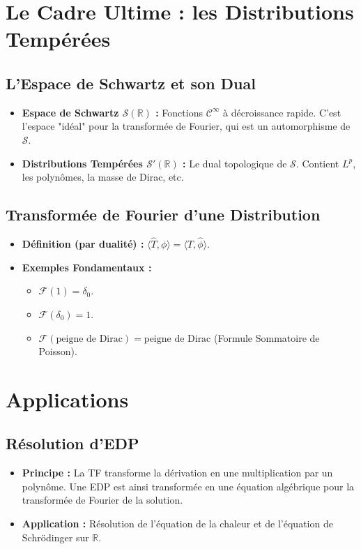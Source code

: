 \documentclass[12pt, a4paper, parskip=full]{report}
\theoremstyle{agregstyle}
\begin{document}
\section{Le Cadre Ultime : les Distributions Tempérées}
\subsection{L'Espace de Schwartz et son Dual}
\begin{itemize}
    \item \textbf{Espace de Schwartz $\mathcal{S}(\mathbb{R})$ :} Fonctions $\mathcal{C}^\infty$ à décroissance rapide. C'est l'espace "idéal" pour la transformée de Fourier, qui est un automorphisme de $\mathcal{S}$.
    \item \textbf{Distributions Tempérées $\mathcal{S}'(\mathbb{R})$ :} Le dual topologique de $\mathcal{S}$. Contient $L^p$, les polynômes, la masse de Dirac, etc.
\end{itemize}
\subsection{Transformée de Fourier d'une Distribution}
\begin{itemize}
    \item \textbf{Définition (par dualité) :} $\langle \hat{T}, \phi \rangle = \langle T, \hat{\phi} \rangle$.
    \item \textbf{Exemples Fondamentaux :}
        \begin{itemize}
            \item $\mathcal{F}(1) = \delta_0$.
            \item $\mathcal{F}(\delta_0) = 1$.
            \item $\mathcal{F}(\text{peigne de Dirac}) = \text{peigne de Dirac}$ (Formule Sommatoire de Poisson).
        \end{itemize}
\end{itemize}

\section{Applications}
\subsection{Résolution d'EDP}
\begin{itemize}
    \item \textbf{Principe :} La TF transforme la dérivation en une multiplication par un polynôme. Une EDP est ainsi transformée en une équation algébrique pour la transformée de Fourier de la solution.
    \item \textbf{Application :} Résolution de l'équation de la chaleur et de l'équation de Schrödinger sur $\mathbb{R}$.
\end{itemize}
\end{document}
